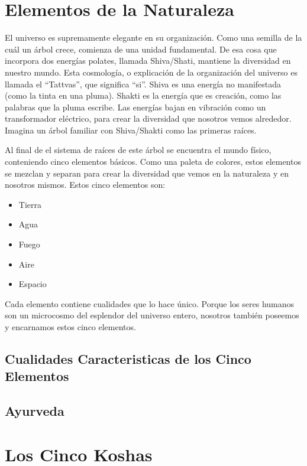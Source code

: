\section{Elementos de  la Naturaleza}
El universo es supremamente elegante en su organización. Como una semilla de la cuál un árbol crece, comienza de una unidad fundamental. De esa cosa que incorpora dos energías polates, llamada Shiva/Shati, mantiene la diversidad en nuestro mundo. Esta cosmología, o explicación de la organización del universo es llamada el ``Tattvas'', que significa ``si''. Shiva es una energía no manifestada (como la tinta en una pluma). Shakti es la energía que es creación, como las palabras que la pluma escribe. Las energías bajan en vibración como un transformador el\'ectrico, para crear la diversidad que nosotros vemos alrededor. Imagina un árbol familiar con Shiva/Shakti como las primeras raíces.

Al final de el sistema de raíces de este árbol se encuentra el mundo físico, conteniendo cinco elementos básicos. Como una paleta de colores, estos elementos se mezclan y separan para crear la diversidad que vemos en la naturaleza y en nosotros mismos. Estos cinco elementos son:

\begin{itemize}
	\item Tierra
	\item Agua
	\item Fuego
	\item Aire
	\item Espacio
\end{itemize}

Cada elemento contiene cualidades que lo hace único. Porque los seres humanos son un microcosmo del esplendor del universo entero, nosotros tambi\'en poseemos y encarnamos estos cinco elementos.



\subsection{Cualidades Caracteristicas de los Cinco Elementos}
\subsection{Ayurveda}
\section{Los Cinco Koshas}
